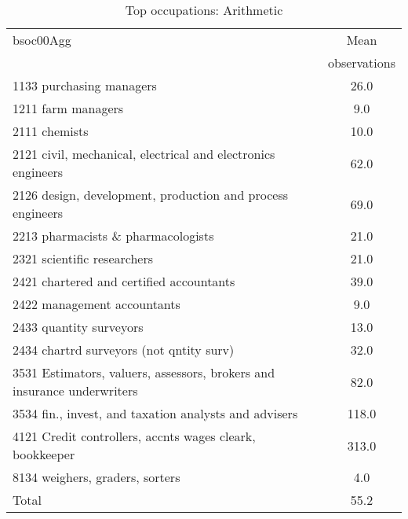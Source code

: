 \begin{table}
	\centering
	\caption{Top occupations: Arithmetic}
	\begin{tabular}{lc}
	\toprule	
		
bsoc00Agg&Mean \\
&observations \\
\hline
1133 purchasing managers&26.0 \\
1211 farm managers&9.0 \\
2111 chemists&10.0 \\
2121 civil, mechanical, electrical and electronics engineers&62.0 \\
2126 design, development, production and process engineers&69.0 \\
2213 pharmacists \& pharmacologists&21.0 \\
2321 scientific researchers&21.0 \\
2421 chartered and certified accountants&39.0 \\
2422 management accountants&9.0 \\
2433 quantity surveyors&13.0 \\
2434 chartrd surveyors (not qntity surv)&32.0 \\
3531 Estimators, valuers, assessors, brokers and insurance underwriters&82.0 \\
3534 fin., invest, and taxation analysts and advisers&118.0 \\
4121 Credit controllers, accnts wages cleark, bookkeeper&313.0 \\
8134 weighers, graders, sorters&4.0 \\
Total&55.2 \\
\bottomrule
\bottomrule
\end{tabular}
\end{table}
